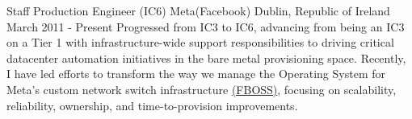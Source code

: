 
\begin{cventries}

  \cventry
  {Staff Production Engineer (IC6)} %
  {Meta(Facebook)} %
  {Dublin, Republic of Ireland} %
  {March 2011 - Present} %
  {
    Progressed from IC3 to IC6, advancing from being an IC3 on a Tier 1 with infrastructure-wide support responsibilities to
    driving critical datacenter automation initiatives in the bare metal provisioning space.
    Recently, I have led efforts to transform the way
    we manage the Operating System for Meta's custom network switch infrastructure
    \href{https://engineering.fb.com/2015/03/10/data-center-engineering/facebook-open-switching-system-fboss-and-wedge-in-the-open/}{(FBOSS)},
    focusing on scalability, reliability, ownership, and time-to-provision improvements.
  }
  \vspace{5mm}


\end{cventries}
